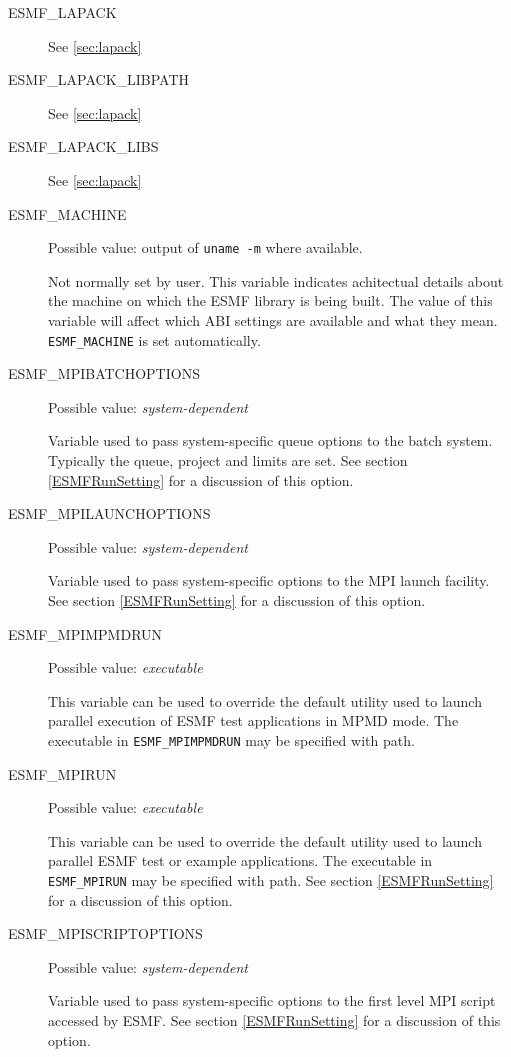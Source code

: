 \begin{description}
\item[ESMF\_LAPACK]
See \ref{sec:lapack}

\item[ESMF\_LAPACK\_LIBPATH]
See \ref{sec:lapack}

\item[ESMF\_LAPACK\_LIBS]
See \ref{sec:lapack}

\item[ESMF\_MACHINE]
Possible value: output of {\tt uname -m} where available.

Not normally set by user. This variable indicates achitectual details about
the machine on which the ESMF library is being built. The value of this 
variable will affect which ABI settings are available and what they mean. 
{\tt ESMF\_MACHINE} is set automatically.

\item[ESMF\_MPIBATCHOPTIONS]
Possible value: {\em system-dependent}

Variable used to pass system-specific queue options to the batch system. 
Typically the queue, project and limits are set.
See section \ref{ESMFRunSetting} for a discussion of this option.

\item[ESMF\_MPILAUNCHOPTIONS]
Possible value: {\em system-dependent}

Variable used to pass system-specific options to the MPI launch facility.
See section \ref{ESMFRunSetting} for a discussion of this option.

\item[ESMF\_MPIMPMDRUN]
Possible value: {\em executable}

This variable can be used to override the default utility used to launch
parallel execution of ESMF test applications in MPMD mode. The executable in
{\tt ESMF\_MPIMPMDRUN} may be specified with path.

\item[ESMF\_MPIRUN]
Possible value: {\em executable}

This variable can be used to override the default utility used to launch
parallel ESMF test or example applications. The executable in {\tt ESMF\_MPIRUN}
may be specified with path. 
See section \ref{ESMFRunSetting} for a discussion of this option.

\item[ESMF\_MPISCRIPTOPTIONS]
Possible value: {\em system-dependent}

Variable used to pass system-specific options to the first level MPI script
accessed by ESMF.
See section \ref{ESMFRunSetting} for a discussion of this option.


\end{description}
